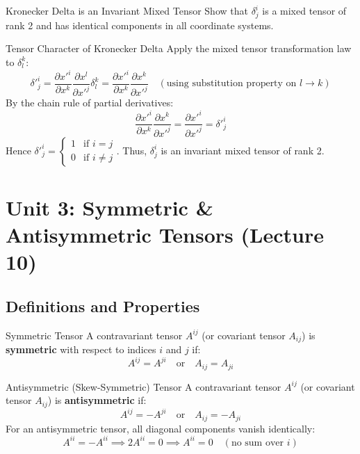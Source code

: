 \documentclass[11pt,a4paper]{article}
\begin{document}
\begin{theorembox}{Kronecker Delta is an Invariant Mixed Tensor}
Show that $\delta^i_j$ is a mixed tensor of rank 2 and has identical components in all coordinate systems.
\end{theorembox}
\begin{proofbox}{Tensor Character of Kronecker Delta}
Apply the mixed tensor transformation law to $\delta^k_l$:
\[
\delta'^i_j = \frac{\partial x'^i}{\partial x^k} \frac{\partial x^l}{\partial x'^j} \delta^k_l = \frac{\partial x'^i}{\partial x^k} \frac{\partial x^k}{\partial x'^j} \quad (\text{using substitution property on } l \to k)
\]
By the chain rule of partial derivatives:
\[
\frac{\partial x'^i}{\partial x^k} \frac{\partial x^k}{\partial x'^j} = \frac{\partial x'^i}{\partial x'^j} = \delta'^i_j
\]
Hence $\delta'^i_j = \begin{cases} 1 & \text{if } i=j \\ 0 & \text{if } i \neq j \end{cases}$. Thus, $\delta^i_j$ is an invariant mixed tensor of rank 2.
\end{proofbox}

\newpage
\section{Unit 3: Symmetric \& Antisymmetric Tensors (Lecture 10)}

\subsection{Definitions and Properties}
\begin{definitionbox}{Symmetric Tensor}
A contravariant tensor $A^{ij}$ (or covariant tensor $A_{ij}$) is \textbf{symmetric} with respect to indices $i$ and $j$ if:
\[
A^{ij} = A^{ji} \quad \text{or} \quad A_{ij} = A_{ji}
\]
\end{definitionbox}

\begin{definitionbox}{Antisymmetric (Skew-Symmetric) Tensor}
A contravariant tensor $A^{ij}$ (or covariant tensor $A_{ij}$) is \textbf{antisymmetric} if:
\[
A^{ij} = -A^{ji} \quad \text{or} \quad A_{ij} = -A_{ji}
\]
For an antisymmetric tensor, all diagonal components vanish identically:
\[
A^{ii} = -A^{ii} \implies 2 A^{ii} = 0 \implies A^{ii} = 0 \quad (\text{no sum over } i)
\]
\end{definitionbox}
\end{document}
